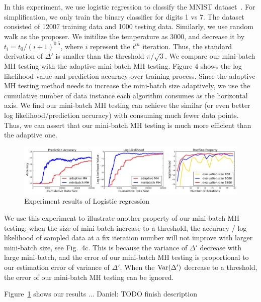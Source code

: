 \documentclass{article}
\begin{document}
In this experiment, we use logistic regression to classify the MNIST
dataset~\cite{lecun-mnisthandwrittendigit-2010}. For simplification, we only train the binary
classifier for digits 1 vs 7. The dataset consisted of 12007 training data and 1000 testing data.
Similarly, we use random walk as the proposer. We initilize the temperature as 3000, and decrease it
by $t_i = t_0 / (i + 1)^{0.5}$, where $i$ represent the $t^{th}$ iteration. Thus, the standard
derivation of $\Delta'$ is smaller than the threshold $\pi/\sqrt{3}$.  We compare our mini-batch MH
testing with the adaptive mini-batch MH testing. Figure 4 shows the log likelihood value and
prediction accuracy over training process. Since the adaptive MH testing method needs to increase
the mini-batch size adaptively, we use the cumulative number of data instance each algorithm
consumes as the horizontal axis. We find our mini-batch MH testing can achieve the similar (or even
better log likelihood/prediction accuracy) with consuming much fewer data points. Thus, we can
assert that our mini-batch MH testing is much more efficient than the adaptive one. 


\begin{figure}[t]
    \centering
    \includegraphics[width=1\linewidth]{exp2.png}
    \caption{Experiment results of Logistic regression}
    \label{fig:logistic_fig}
\end{figure}

We use this experiment to illustrate another property of our mini-batch MH testing: when the size of
mini-batch increase to a threshold, the accuracy / log likelihood of sampled data at a fix iteration
number will not improve with larger mini-batch size, see Fig.~4c. This is because the variance of
$\Delta'$ decrease with large mini-batch, and the error of our mini-batch MH testing is proportional
to our estimation error of variance of $\Delta'$. When the ${\rm Var}(\Delta')$ decrease to a
threshold, the error of our mini-batch MH testing can be ignored.  

Figure~\ref{fig:logistic_fig} shows our results ... {\color{blue} Daniel: TODO finish description}
\end{document}
